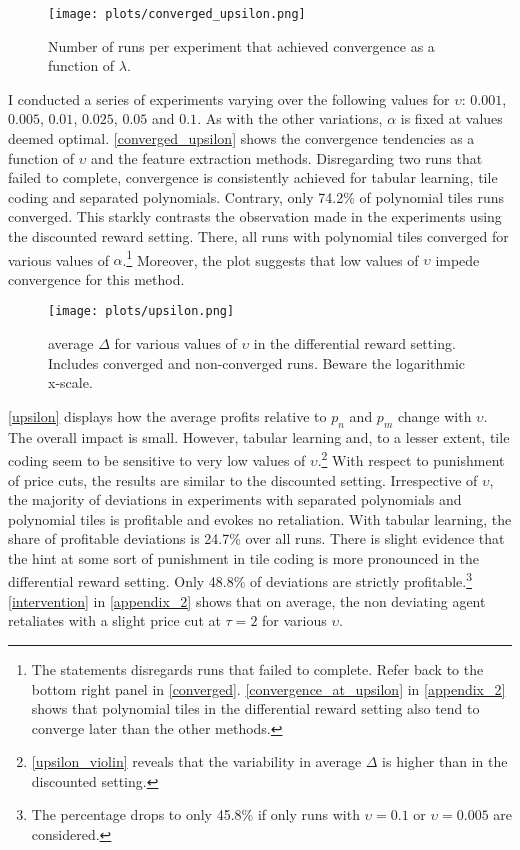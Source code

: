 \begin{figure}
	\texttt{[image: plots/converged\_upsilon.png]}
	\caption{Number of runs per experiment that achieved convergence as a function of $\lambda$.}
	\label{converged_upsilon}
\end{figure}

I conducted a series of experiments varying over the following values for $\upsilon$: $0.001$, $0.005$, $0.01$, $0.025$, $0.05$ and $0.1$. As with the other variations, $\alpha$ is fixed at values deemed optimal. \autoref{converged_upsilon} shows the convergence tendencies as a function of $\upsilon$ and the feature extraction methods. Disregarding two runs that failed to complete, convergence is consistently achieved for tabular learning, tile coding and separated polynomials. Contrary, only 74.2\% of polynomial tiles runs converged. This starkly contrasts the observation made in the experiments using the discounted reward setting. There, all runs with polynomial tiles converged for various values of $\alpha$.\footnote{The statements disregards runs that failed to complete. Refer back to the bottom right panel in \autoref{converged}. \autoref{convergence_at_upsilon} in \autoref{appendix_2} shows that polynomial tiles in the differential reward setting also tend to converge later than the other methods.} Moreover, the plot suggests that low values of $\upsilon$ impede convergence for this method.


 \begin{figure}
	\texttt{[image: plots/upsilon.png]}
	\caption{average $\Delta$ for various values of $\upsilon$ in the differential reward setting. Includes converged and non-converged runs. Beware the logarithmic x-scale.}
	\label{upsilon}
\end{figure}


\autoref{upsilon} displays how the average profits relative to $p_n$ and $p_m$ change with $\upsilon$. The overall impact is small. However, tabular learning and, to a lesser extent, tile coding seem to be sensitive to very low values of $\upsilon$.\footnote{\autoref{upsilon_violin} reveals that the variability in average $\Delta$ is higher than in the discounted setting.} With respect to punishment of price cuts, the results are similar to the discounted setting. Irrespective of $\upsilon$, the majority of deviations in experiments with separated polynomials and polynomial tiles is profitable and evokes no retaliation. With tabular learning, the share of profitable deviations is 24.7\% over all runs. There is slight evidence that the hint at some sort of punishment in tile coding is more pronounced in the differential reward setting. Only 48.8\% of deviations are strictly profitable.\footnote{The percentage drops to only 45.8\% if only runs with $\upsilon = 0.1$ or $\upsilon = 0.005$ are considered.} \autoref{intervention} in \autoref{appendix_2} shows that on average, the non deviating agent retaliates with a slight price cut at $\tau = 2$ for various $\upsilon$.


\pagebreak